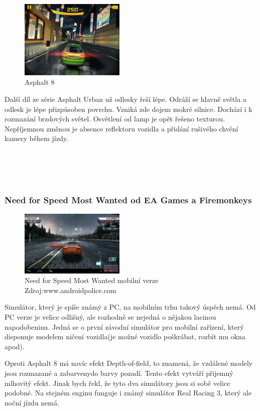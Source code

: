 \documentclass[11pt,twoside,a4paper]{book}
\begin{document}
\begin{figure}
  \includegraphics[width=50mm]{figures/games/a8.png}
  \caption{Asphalt 8}
\end{figure}
Další díl ze série Asphalt Urban už odlesky řeší lépe. Odráží se hlavně světla a odlesk je lépe přizpůsoben povrchu. Vzniká zde dojem mokré silnice. Dochází i k rozmazání brzdových světel. Osvětlení od lamp je opět řešeno texturou. Nepříjemnou změnou je absence reflektoru vozidla a přidání rušivého chvění kamery během jízdy.
\\ \\ \\ \\ \\

\subsubsection{Need for Speed Most Wanted od EA Games a Firemonkeys}
\begin{figure}
  \includegraphics[width=50mm]{figures/games/nfs.png}
  \caption{Need for Speed Most Wanted mobilní verze Zdroj:www.androidpolice.com}
\end{figure}
Simulátor, který je spíše známý z PC, na mobilním trhu takový úspěch nemá. Od PC verze je velice odlišný, ale rozhodně se nejedná o nějakou lacinou napodobeninu. Jedná se o první závodní simulátor pro mobilní zařízení, který disponuje modelem ničení vozidla(je možné vozidlo poškrábat, rozbít mu okna apod).

Oproti Asphalt 8 má navíc efekt Depth-of-field, to znamená, že vzdálené modely jsou rozmazané a zabarveny\linebreak do barvy pozadí. Tento efekt vytváří přijemný mlhovitý efekt. Jinak bych řekl, že tyto dva simulátory jsou si sobě velice podobné. Na stejném enginu funguje i známý simulátor Real Racing 3, který ale noční jízdu nemá.
\newpage
\end{document}
